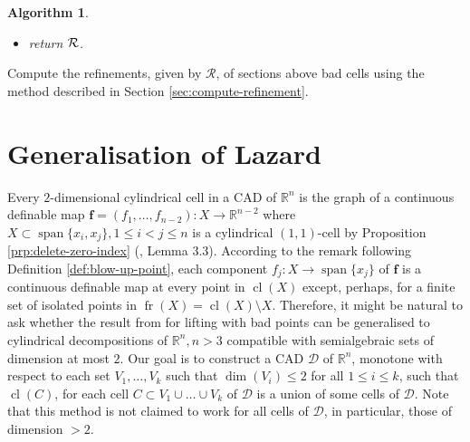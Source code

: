 \documentclass[
]{book}
\newtheorem{algorithm}{Algorithm}
\theoremstyle{definition}
\theoremstyle{definition}
\theoremstyle{definition}
\theoremstyle{definition}
\theoremstyle{remark}
\begin{document}
\begin{algorithm}
\begin{itemize}
\begin{itemize}
    \begin{itemize}
    \item
      If \(g \in \mathbb{Q}[x_1]\), then \(h := g_2\). Otherwise, \(g \in \mathbb{Q}[x_1,x_2]\) and \(h := g_1\).
    \item
      Define the saturation
      \[
      I := \langle f, g, 1 - z h \rangle \cap \mathbb{Q}[x_1,x_2,x_3],
      \]
      where \(z\) is a new variable.
    \item
      Compute a generator system \(S\), i.e., a Groebner basis for the ideal \(I\).
    \item
      Compute
      \[
      L := \{ {\mathrm{sub}}_{\mathbf{b}}(f') \in \mathbb{Q}[x_3] \mid f' \in S \}
      \]
      and find the real roots
      \[
      (c_1,\ldots,c_t)
      \]
      of \(L\).
    \item
      Let
      \[
      {\cal R} := {\cal R} \cup \{ {\cal R}_{\mathbf{b}} = (c_1,\ldots,c_t) \}.
      \]
    \end{itemize}
  \end{itemize}
\item
  return \(\cal R\).
\end{itemize}

\end{algorithm}

Compute the refinements, given by \(\mathcal{R}\), of sections above bad cells using the method described in Section \ref{sec:compute-refinement}.

\hypertarget{sec:lazard-n}{%
\section{Generalisation of Lazard}\label{sec:lazard-n}}

Every \(2\)-dimensional cylindrical cell in a CAD of \(\mathbb{R}^n\) is the graph of a continuous definable map \(\mathbf{f} = (f_1,\ldots,f_{n-2}) : X \to \mathbb{R}^{n-2}\) where \(X \subset {\operatorname{span} \{x_i,x_j\}}, 1 \le i < j \le n\) is a cylindrical
\((1,1)\)-cell by Proposition \ref{prp:delete-zero-index} (\citet{bgv13}, Lemma 3.3). According to the remark following
Definition \ref{def:blow-up-point}, each component \(f_j : X \to {\operatorname{span} \{x_j\}}\) of \(\mathbf{f}\) is a continuous definable map at every point in \({\operatorname{cl} \left( X \right)}\) except, perhaps, for a finite set of isolated points in \({\operatorname{fr} \left( X \right)} = {\operatorname{cl} \left( X \right)} \setminus X\).
Therefore, it might be natural to ask whether the result from \citet{lazard10} for lifting with bad points can be generalised to cylindrical decompositions of \(\mathbb{R}^n, n > 3\) compatible with semialgebraic sets of dimension at most \(2\).
Our goal is to construct a CAD \(\mathcal{D}\) of \(\mathbb{R}^n\), monotone with respect to each set \(V_1, \ldots, V_k\) such that \(\dim(V_i) \le 2\) for all \(1 \le i \le k\), such that \({\operatorname{cl} \left( C \right)}\), for each cell \(C \subset V_1 \cup \ldots \cup V_k\) of \(\mathcal{D}\) is a union of some cells of \(\mathcal{D}\).
Note that this method is not claimed to work for all cells of \(\mathcal{D}\), in particular, those of dimension \(> 2\).
\end{document}
